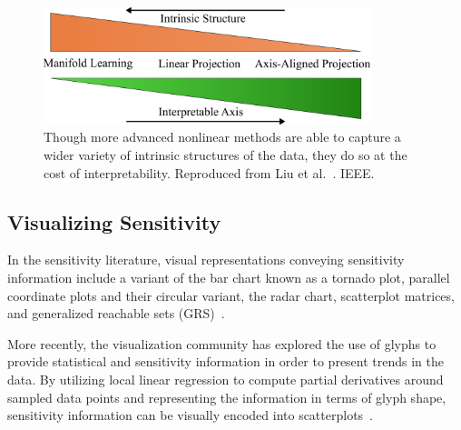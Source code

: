 \begin{figure}[!ht]
  \centering
  \includegraphics[width=0.85\textwidth]{figs/chap3/interpretableAxis}
  \caption[Interpretability of Dimensionality Reduction Techniques]{Though more advanced nonlinear methods are able to capture a wider variety of intrinsic structures of the data, they do so at the cost of interpretability. Reproduced from Liu et al.~\cite{LiuMaljovecWang2015}.  IEEE. }
  \label{fig:axisInterpretability}
\end{figure}

\subsection{Visualizing Sensitivity}
\label{sec:SA_visualization}
In the sensitivity literature, visual representations conveying sensitivity information include a variant of the bar chart known as a tornado plot, parallel coordinate plots and their circular variant, the radar chart, scatterplot matrices,  and generalized reachable sets (GRS)~\cite{SaltelliChanScott2000,BushenkovChernykhKamenev1995}.

More recently, the visualization community has explored the use of glyphs to provide statistical and sensitivity information in order to present trends in the data.
%
By utilizing local linear regression to compute partial derivatives around sampled data points and representing the information in terms of glyph shape, sensitivity information can be visually encoded into scatterplots~\cite{CorreaChanMa2009,ChanCorreaMa2010,GuoWardRundensteiner2011,ChanCorreaMa2013}.

